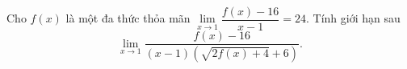 \begin{vd}%
	Cho $f(x)$ là một đa thức thỏa mãn $\displaystyle\lim\limits_{x\to 1}\dfrac{f(x)-16}{x-1}=24$. Tính giới hạn sau $$\displaystyle\lim\limits_{x\to 1}\dfrac{f(x)-16}{\left({x-1}\right)\left(\sqrt{2f(x)+4}+6\right)}.$$
\end{vd}


